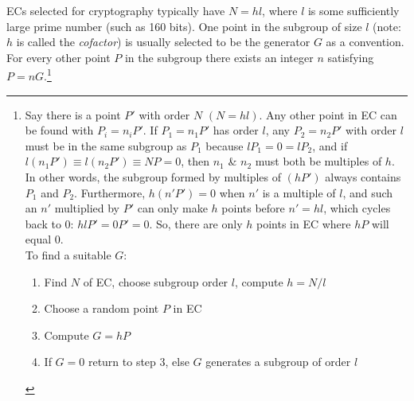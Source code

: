 ECs selected for cryptography typically have $N = hl$, where $l$ is some sufficiently large prime number (such as 160 bits). One point in the subgroup of size $l$ (note: $h$ is called the {\em cofactor}) is usually selected to be the generator $G$ as a convention. For every other point $P$ in the subgroup there exists an integer $n$ satisfying $P = nG$.\footnote{\label{subgroups_note}Say there is a point $P'$ with order $N$ $(N=h l)$. Any other point in EC can be found with $P_i=n_i P'$. If $P_1=n_1 P'$ has order $l$, any $P_2=n_2 P'$ with order $l$ must be in the same subgroup as $P_1$ because $l P_1=0 = l P_2$, and if $l(n_1 P') \equiv l(n_2 P') \equiv N P=0$, then $n_1$ \& $n_2$ must both be multiples of $h$. In other words, the subgroup formed by multiples of $(h P')$ always contains $P_1$ and $P_2$. Furthermore, $h(n' P')=0$ when $n'$ is a multiple of $l$, and such an $n'$ multiplied by $P'$ can only make $h$ points before $n' = h l$, which cycles back to 0: $h l P' = 0P' = 0$. So, there are only $h$ points in EC where $h P$ will equal 0.
\\ \newline
To find a suitable $G$:
\begin{enumerate}
    \item Find $N$ of EC, choose subgroup order $l$, compute $h=N/l$
    \item Choose a random point $P$ in EC
    \item Compute $G=h P$
    \item If $G=0$ return to step 3, else $G$ generates a subgroup of order $l$
\end{enumerate}}

